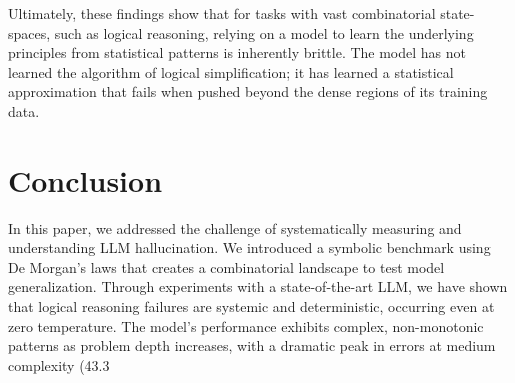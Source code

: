\documentclass[11pt,a4paper]{article}
\begin{document}
Ultimately, these findings show that for tasks with vast combinatorial state-spaces, such as logical reasoning, relying on a model to learn the underlying principles from statistical patterns is inherently brittle. The model has not learned the algorithm of logical simplification; it has learned a statistical approximation that fails when pushed beyond the dense regions of its training data.

\section{Conclusion}
In this paper, we addressed the challenge of systematically measuring and understanding LLM hallucination. We introduced a symbolic benchmark using De Morgan's laws that creates a combinatorial landscape to test model generalization. Through experiments with a state-of-the-art LLM, we have shown that logical reasoning failures are systemic and deterministic, occurring even at zero temperature. The model's performance exhibits complex, non-monotonic patterns as problem depth increases, with a dramatic peak in errors at medium complexity (43.3%



\end{document}
